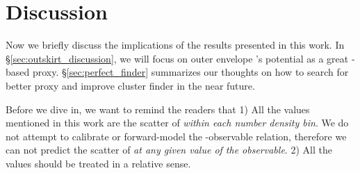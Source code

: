 \documentclass[fleqn,usenatbib,useAMS,english]{mnras}
\begin{document}
\section{Discussion}
    \label{sec:discussion}
    
    Now we briefly discuss the implications of the results presented in this work. 
    In \S \ref{sec:outskirt_discussion}, we will focus on outer envelope \mstar{}'s potential 
    as a great \mstar{}-based \mvir{} proxy.
    \S \ref{sec:perfect_finder} summarizes our thoughts on how to search for better \mvir{} proxy
    and improve cluster finder in the near future.

    Before we dive in, we want to remind the readers that
    1) All the \sigmh{} values mentioned in this work are the scatter of \mvir{} \emph{within each
    number density bin}. 
    We do not attempt to calibrate or forward-model the \mvir{}-observable
    relation, therefore we can not predict the scatter of \mvir{} \emph{at any given value of
    the observable}.
    2) All the \sigmh{} values should be treated in a relative sense.
    
\end{document}
